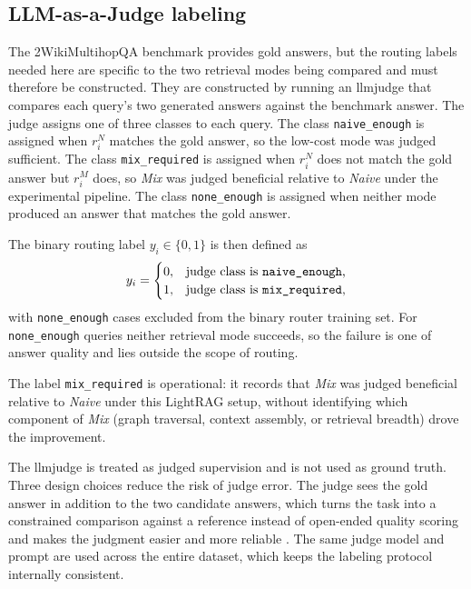 \documentclass[english, bibtex]{kththesis}               %
\numberwithin{listing}{chapter}
\begin{document}
\subsection{LLM-as-a-Judge labeling}
\label{sec:methodJudge}

The 2WikiMultihopQA benchmark provides gold answers, but the routing labels needed here are specific to the two retrieval modes being compared and must therefore be constructed. They are constructed by running an \gls{llmjudge} \cite{zheng2023judge} that compares each query's two generated answers against the benchmark answer. The judge assigns one of three classes to each query. The class \texttt{naive\_enough} is assigned when \(r_i^N\) matches the gold answer, so the low-cost mode was judged sufficient. The class \texttt{mix\_required} is assigned when \(r_i^N\) does not match the gold answer but \(r_i^M\) does, so \emph{Mix} was judged beneficial relative to \emph{Naive} under the experimental pipeline. The class \texttt{none\_enough} is assigned when neither mode produced an answer that matches the gold answer.

The binary routing label \(y_i \in \{0, 1\}\) is then defined as
\begin{equation}
\label{eq:routingLabel}
y_i =
\begin{cases}
0, & \text{judge class is \texttt{naive\_enough},}\\
1, & \text{judge class is \texttt{mix\_required},}
\end{cases}
\end{equation}
with \texttt{none\_enough} cases excluded from the binary router training set. For \texttt{none\_enough} queries neither retrieval mode succeeds, so the failure is one of answer quality and lies outside the scope of routing.

The label \texttt{mix\_required} is operational: it records that \emph{Mix} was judged beneficial relative to \emph{Naive} under this LightRAG setup, without identifying which component of \emph{Mix} (graph traversal, context assembly, or retrieval breadth) drove the improvement.

The \gls{llmjudge} is treated as judged supervision and is not used as ground truth. Three design choices reduce the risk of judge error. The judge sees the gold answer in addition to the two candidate answers, which turns the task into a constrained comparison against a reference instead of open-ended quality scoring and makes the judgment easier and more reliable \cite{zheng2023judge}. The same judge model and prompt are used across the entire dataset, which keeps the labeling protocol internally consistent.
\end{document}
